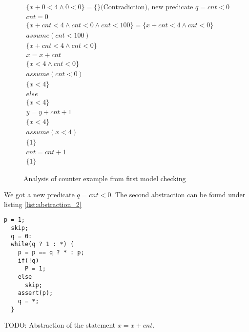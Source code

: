 \begin{figure}
\begin{equation}
\begin{array}{l}
\{x + 0 < 4 \land 0 < 0\} = \{\} \mbox{(Contradiction), new predicate } q = cnt < 0\\
cnt = 0\\
\{x + cnt < 4 \land cnt < 0 \land cnt < 100\} = \{x + cnt < 4 \land cnt < 0 \}\\
assume(cnt < 100)\\
\{x + cnt < 4 \land cnt < 0 \}\\
x = x + cnt\\
\{x < 4 \land cnt < 0 \}\\
assume(cnt < 0)\\
\{x < 4 \}\\
else\\
\{x < 4 \}\\
y = y + cnt + 1\\
\{x < 4 \}\\
assume(x < 4)\\
\{1 \}\\
cnt = cnt + 1\\
\{1 \}
\end{array}
\label{lst:analysis_}
\end{equation}
\caption{Analysis of counter example from first model checking}
\end{figure}

We got a new predicate $q = cnt < 0$. The second abstraction can be found under listing \ref{list:abstraction_2}
\begin{lstlisting}[caption=Second abstraction using predicates $p$ and $q$, label=lst:abstraction_2]
  p = 1;
  skip;
  q = 0:
  while(q ? 1 : *) {
    p = p == q ? * : p;
    if(!q)
      P = 1;
    else
      skip;
    assert(p);
    q = *;
  }
\end{lstlisting}

TODO: Abstraction of the statement $x = x + cnt$.


